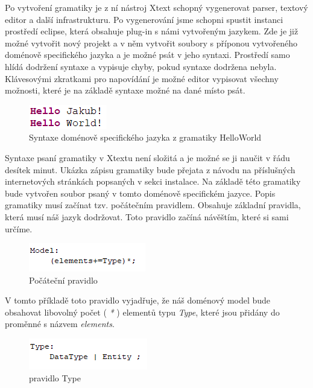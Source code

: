 Po vytvoření gramatiky je z ní nástroj Xtext schopný vygenerovat parser, textový editor a další infrastrukturu. Po vygenerování jsme schopni spustit instanci prostředí eclipse, která obsahuje plug-in s námi vytvořeným jazykem. Zde je již možné vytvořit nový projekt a v něm vytvořit soubory s příponou vytvořeného doménově specifického jazyka a je možné psát v jeho syntaxi. Prostředí samo hlídá dodržení syntaxe a vypisuje chyby, pokud syntaxe dodržena nebyla. Klávesovými zkratkami pro napovídání je možné editor vypisovat všechny možnosti, které je na základě syntaxe možné na dané místo psát. 

\begin{figure}[H]
	\centering
	\includegraphics[width=0.2\linewidth]{images/xtext/hello_world_dsl}
	\caption{Syntaxe doménově specifického jazyka z gramatiky HelloWorld}
\end{figure}

Syntaxe psaní gramatiky v Xtextu není složitá a je možné se ji naučit v řádu desítek minut. Ukázka zápisu gramatiky bude přejata z návodu na příslušných internetových stránkách popsaných v sekci instalace. Na základě této gramatiky bude vytvořen soubor psaný v tomto doménově specifickém jazyce. Popis gramatiky musí začínat tzv. počátečním pravidlem. Obsahuje základní pravidla, která musí náš jazyk dodržovat. Toto pravidlo začíná návěštím, které si sami určíme. 

\begin{figure}[H]
	\centering
	\includegraphics[width=0.4\linewidth]{images/xtext/model}
	\caption{Počáteční pravidlo}
\end{figure}

V tomto příkladě toto pravidlo vyjadřuje, že náš doménový model bude obsahovat libovolný počet ( \textit{*} ) elementů typu \textit{Type}, které jsou přidány do proměnné s názvem \textit{elements}.

\begin{figure}[H]
	\centering
	\includegraphics[width=0.4\linewidth]{images/xtext/type}
	\caption{pravidlo Type}
\end{figure}

